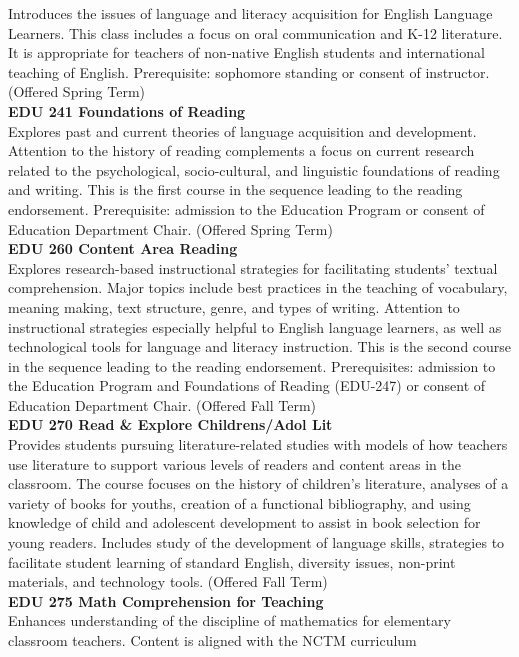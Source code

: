 \documentclass[
  letterpaper,
]{scrbook}
\begin{document}
Introduces the issues of language and literacy acquisition for English
Language Learners. This class includes a focus on oral communication and
K-12 literature. It is appropriate for teachers of non-native English
students and international teaching of English. Prerequisite: sophomore
standing or consent of instructor. (Offered Spring Term)\\
\textbf{EDU 241 Foundations of Reading}\\
Explores past and current theories of language acquisition and
development. Attention to the history of reading complements a focus on
current research related to the psychological, socio-cultural, and
linguistic foundations of reading and writing. This is the first course
in the sequence leading to the reading endorsement. Prerequisite:
admission to the Education Program or consent of Education Department
Chair. (Offered Spring Term)\\
\textbf{EDU 260 Content Area Reading}\\
Explores research-based instructional strategies for facilitating
students' textual comprehension. Major topics include best practices in
the teaching of vocabulary, meaning making, text structure, genre, and
types of writing. Attention to instructional strategies especially
helpful to English language learners, as well as technological tools for
language and literacy instruction. This is the second course in the
sequence leading to the reading endorsement. Prerequisites: admission to
the Education Program and Foundations of Reading (EDU-247) or consent of
Education Department Chair. (Offered Fall Term)\\
\textbf{EDU 270 Read \& Explore Childrens/Adol Lit}\\
Provides students pursuing literature-related studies with models of how
teachers use literature to support various levels of readers and content
areas in the classroom. The course focuses on the history of children's
literature, analyses of a variety of books for youths, creation of a
functional bibliography, and using knowledge of child and adolescent
development to assist in book selection for young readers. Includes
study of the development of language skills, strategies to facilitate
student learning of standard English, diversity issues, non-print
materials, and technology tools. (Offered Fall Term)\\
\textbf{EDU 275 Math Comprehension for Teaching}\\
Enhances understanding of the discipline of mathematics for elementary
classroom teachers. Content is aligned with the NCTM curriculum
\end{document}
